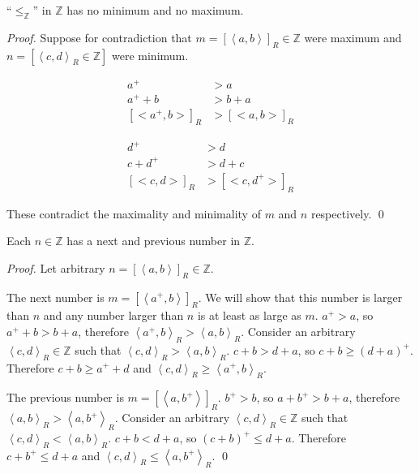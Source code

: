 \documentclass[11pt]{llncs}
\begin{document}
\begin{lemma}
  ``$\leq_\mathbb{Z}$'' in $\mathbb{Z}$ has no minimum and no maximum.
\end{lemma}
\begin{proof}
  Suppose for contradiction that $m = [\left<a, b\right>]_R \in \mathbb{Z}$ were
  maximum and $n = [\left<c, d\right>_R \in \mathbb{Z}]$ were minimum.

  \begin{minipage}[t]{0.49\textwidth}
    \begin{align*}
      a^+ &> a\\
      a^+ + b &> b + a\\
      [\bigl<a^+, b\bigr>]_R &> [\bigl<a, b\bigr>]_R
    \end{align*}
  \end{minipage}
  \textwidth
  \vline
  \textwidth
  \begin{minipage}[t]{0.49\textwidth}
    \begin{align*}
      d^+ &> d\\
      c + d^+ &> d + c\\
      [\bigl<c, d\bigr>]_R &> [\bigl<c, d^+\bigr>]_R
    \end{align*}
  \end{minipage}
  \textwidth

  These contradict the maximality and minimality of $m$ and $n$ respectively.
  \qed
\end{proof}

\begin{lemma}
  Each $n \in \mathbb{Z}$ has a next and previous number in $\mathbb{Z}$.
\end{lemma}
\begin{proof}
  Let arbitrary $n = [\left<a, b\right>]_R \in \mathbb{Z}$.

  The next number is $m = [\left<a^+, b\right>]_R$.
  We will show that this number is larger than $n$ and
  any number larger than $n$ is at least as large as $m$.
  $a^+ > a$, so $a^+ + b > b + a$, therefore
  $\left<a^+, b\right>_R > \left<a, b\right>_R$.
  Consider an arbitrary $\left<c, d\right>_R \in \mathbb{Z}$
  such that $\left<c, d\right>_R > \left<a, b\right>_R$.
  $c + b > d + a$, so $c + b \geq (d + a)^+$.
  Therefore $c + b \geq a^+ + d$
  and $\left<c, d\right>_R \geq \left<a^+, b\right>_R$.

  The previous number is $m = [\left<a, b^+\right>]_R$.
  $b^+ > b$, so
  $a + b^+ > b + a$, therefore
  $\left<a, b\right>_R > \left<a, b^+\right>_R$.
  Consider an arbitrary $\left<c, d\right>_R \in \mathbb{Z}$
  such that $\left<c, d\right>_R < \left<a, b\right>_R$.
  $c + b < d + a$, so $(c + b)^+ \leq d + a$.
  Therefore $c + b^+ \leq d + a$
  and $\left<c, d\right>_R \leq \left<a, b^+\right>_R$.
  \qed
\end{proof}
\end{document}
